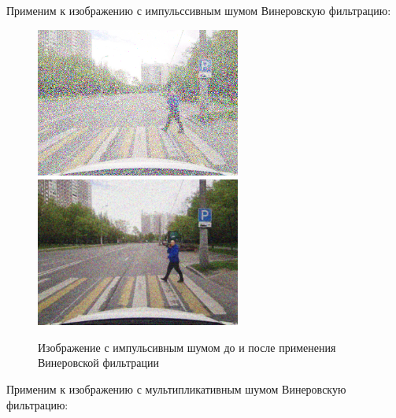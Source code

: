 Применим к изображению с импульссивным шумом Винеровскую фильтрацию:

\begin{figure}[hbt!]
    \centering
    \includegraphics[width=0.6\textwidth]{../outputs/image_impulse_noise.png}
    \includegraphics[width=0.6\textwidth]{../outputs/image_gaussian_filter.png}
    \caption{Изображение с импульсивным шумом до и после применения Винеровской фильтрации}
    \label{fig:stich_images}
\end{figure}

\pagebreak
Применим к изображению с мультипликативным шумом Винеровскую фильтрацию:

